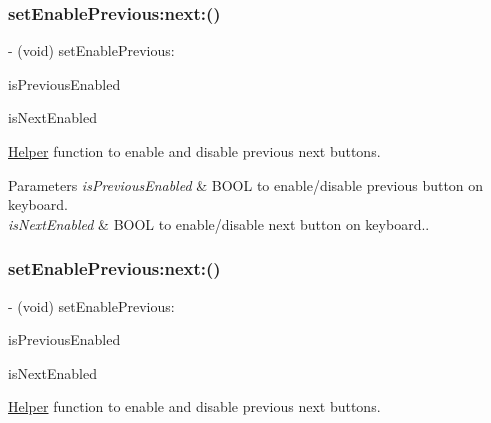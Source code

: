 \subsubsection{\texorpdfstring{set\+Enable\+Previous\+:next\+:()}{setEnablePrevious:next:()}\hspace{0.1cm}{\footnotesize\ttfamily [2/3]}}
{\footnotesize\ttfamily -\/ (void) set\+Enable\+Previous\+: \begin{DoxyParamCaption}\item[{(B\+O\+OL)}]{is\+Previous\+Enabled }\item[{next:(B\+O\+OL)}]{is\+Next\+Enabled }\end{DoxyParamCaption}}

\mbox{\hyperlink{interface_helper}{Helper}} function to enable and disable previous next buttons.


\begin{DoxyParams}{Parameters}
{\em is\+Previous\+Enabled} & B\+O\+OL to enable/disable previous button on keyboard. \\
\hline
{\em is\+Next\+Enabled} & B\+O\+OL to enable/disable next button on keyboard.. \\
\hline
\end{DoxyParams}
\mbox{\label{category_u_i_view_07_i_q_toolbar_addition_08_af67c004fb5a380228b408ec07c9eca2c}} 
\subsubsection{\texorpdfstring{set\+Enable\+Previous\+:next\+:()}{setEnablePrevious:next:()}\hspace{0.1cm}{\footnotesize\ttfamily [3/3]}}
{\footnotesize\ttfamily -\/ (void) set\+Enable\+Previous\+: \begin{DoxyParamCaption}\item[{(B\+O\+OL)}]{is\+Previous\+Enabled }\item[{next:(B\+O\+OL)}]{is\+Next\+Enabled }\end{DoxyParamCaption}}

\mbox{\hyperlink{interface_helper}{Helper}} function to enable and disable previous next buttons.


